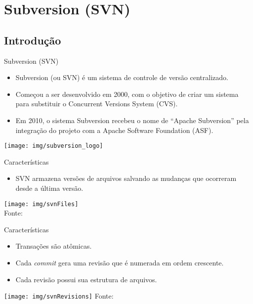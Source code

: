 \documentclass[a4paper]{beamer}
\begin{document}
\section{Subversion (SVN)}

\subsection{Introdução}

\begin{frame}{Subversion (SVN)}

\begin{itemize}
\item Subversion (ou SVN) é um sistema de controle de versão centralizado.
\item Começou a ser desenvolvido em 2000, com o objetivo de criar um sistema para substituir o Concurrent Versions System (CVS).
\item Em 2010, o sistema Subversion recebeu o nome de ``Apache Subversion'' pela integração do projeto com a Apache Software Foundation (ASF).
\end{itemize}

\begin{center}
\texttt{[image: img/subversion\_logo]}
\end{center}

\end{frame}

\begin{frame}{Características}

\begin{itemize}
\item SVN armazena versões de arquivos salvando as mudanças que ocorreram desde a última versão.
\end{itemize}

\begin{center}
\texttt{[image: img/svnFiles]}\\
{\scriptsize Fonte: \cite{proGit}}
\end{center}

\end{frame}

\begin{frame}{Características}

\begin{itemize}[<+->]
\item Transações são atômicas.
\item Cada \textit{commit} gera uma revisão que é numerada em ordem crescente.
\item Cada revisão possui sua estrutura de arquivos.
\end{itemize}

\begin{center}
\texttt{[image: img/svnRevisions]}
\hspace{5pt}
{\scriptsize Fonte: \cite{svnBook}}
\end{center}

\end{frame}
\end{document}
